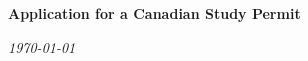 \begin{titlepage}
    \AddToShipoutPicture*{\backgroundpicTR}
    \vfill
    \begin{minipage}{0.9\textwidth}
        \hfill
        \vspace{2.5cm}
        {\color{myBlue}\singlespacing\fontsize{50}{50}\selectfont\bfseries{}\par}
        \vspace{0.4cm}
        {\color{myBlue}\singlespacing\fontsize{50}{50}\selectfont\bfseries{}\par}
        \vspace{1.5cm}
        {\color{myBlue}\bfseries\Large{Application for a Canadian Study Permit}\par}
        \vspace{13cm}
        {\Large{\textit{\color{black}{\docAuthor}}}\par}
        \vspace{0.5cm}
        {\normalsize{\textit{\today}}\par}
    \end{minipage}
\end{titlepage}

\clearpage
